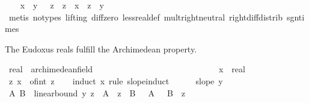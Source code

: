 \begin{isabellebody}
\ \ \isamarkupfalse%
\ {\isachardoublequoteopen}{\isasymlbrakk}x\ {\isacharless}{\kern0pt}\ y{\isacharsemicolon}{\kern0pt}\ {}\ {\isacharless}{\kern0pt}\ z{\isasymrbrakk}\ {\isasymLongrightarrow}\ z\ {\isacharasterisk}{\kern0pt}\ x\ {\isacharless}{\kern0pt}\ z\ {\isacharasterisk}{\kern0pt}\ y{\isachardoublequoteclose}\ \isamarkupfalse%
\ {\isacharparenleft}{\kern0pt}metis\ {\isacharparenleft}{\kern0pt}no{\isacharunderscore}{\kern0pt}types{\isacharcomma}{\kern0pt}\ lifting{\isacharparenright}{\kern0pt}\ diff{\isacharunderscore}{\kern0pt}zero\ less{\isacharunderscore}{\kern0pt}real{\isacharunderscore}{\kern0pt}def\ mult{\isachardot}{\kern0pt}right{\isacharunderscore}{\kern0pt}neutral\ right{\isacharunderscore}{\kern0pt}diff{\isacharunderscore}{\kern0pt}distrib{\isacharprime}{\kern0pt}\ sgn{\isacharunderscore}{\kern0pt}times{\isacharparenright}{\kern0pt}\isanewline
{}\isamarkupfalse%
%
\endisatagproof
{\isafoldproof}%
%
\isadelimproof
%
\endisadelimproof
%
\begin{isamarkuptext}%
The Eudoxus reals fulfill the Archimedean property.%
\end{isamarkuptext}\isamarkuptrue%
\isamarkupfalse%
\ real\ {\isacharcolon}{\kern0pt}{\isacharcolon}{\kern0pt}\ archimedean{\isacharunderscore}{\kern0pt}field\isanewline
%
\isadelimproof
%
\endisadelimproof
%
\isatagproof
{}\isamarkupfalse%
\ \ \ \ \ \ \ \ \ \ \ \ \ \ \ \ \ \ \ \ \ \ \ \ \ \isanewline
\ \ \isamarkupfalse%
\ x\ {\isacharcolon}{\kern0pt}{\isacharcolon}{\kern0pt}\ real\isanewline
\ \ \isamarkupfalse%
\ {\isachardoublequoteopen}{\isasymexists}z{\isachardot}{\kern0pt}\ x\ {\isasymle}\ of{\isacharunderscore}{\kern0pt}int\ z{\isachardoublequoteclose}\isanewline
\ \ \isamarkupfalse%
\ {\isacharparenleft}{\kern0pt}induct\ x\ rule{\isacharcolon}{\kern0pt}\ slope{\isacharunderscore}{\kern0pt}induct{\isacharparenright}{\kern0pt}\isanewline
\ \ \ \ \isamarkupfalse%
\ {\isacharparenleft}{\kern0pt}slope\ y{\isacharparenright}{\kern0pt}\isanewline
\ \ \ \ \isamarkupfalse%
\ \isamarkupfalse%
\ A\ B\ \ linear{\isacharunderscore}{\kern0pt}bound{\isacharcolon}{\kern0pt}\ {\isachardoublequoteopen}{\isasymbar}y\ z{\isasymbar}\ {\isasymle}\ A\ {\isacharasterisk}{\kern0pt}\ {\isasymbar}z{\isasymbar}\ {\isacharplus}{\kern0pt}\ B{\isachardoublequoteclose}\ {\isachardoublequoteopen}{}\ {\isasymle}\ A{\isachardoublequoteclose}\ {\isachardoublequoteopen}{}\ {\isasymle}\ B{\isachardoublequoteclose}\ \ z\ \isamarkupfalse%

\end{isabellebody}

